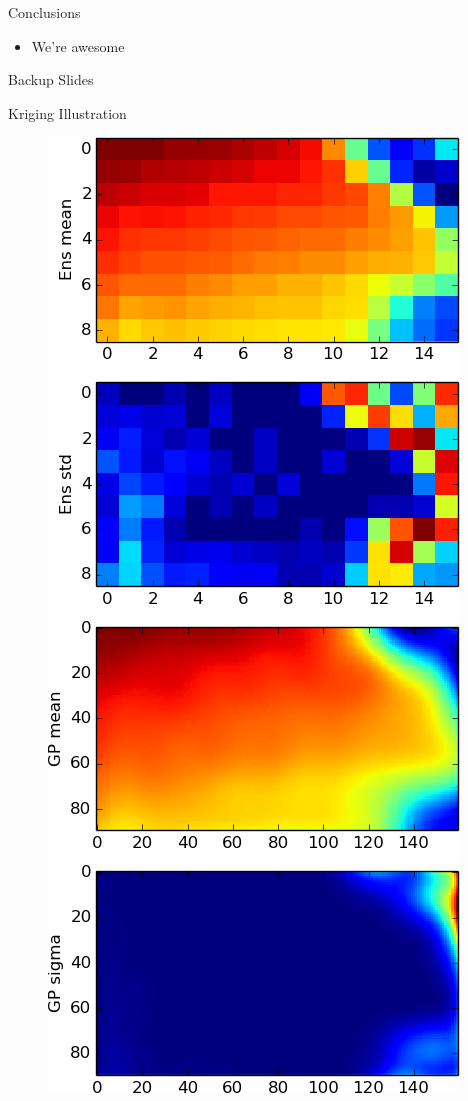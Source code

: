 \documentclass[handout]{beamer}
\begin{document}

\begin{frame}{Conclusions}

\begin{itemize}
  \item We're awesome
\end{itemize}


\end{frame}


\begin{frame}{Backup Slides}
\end{frame}

\begin{frame}{Kriging Illustration}

\begin{figure}
    \includegraphics[scale=0.35]{images/kriging_nugget_interpolation.png}
\end{figure}

\end{frame}
\end{document}
